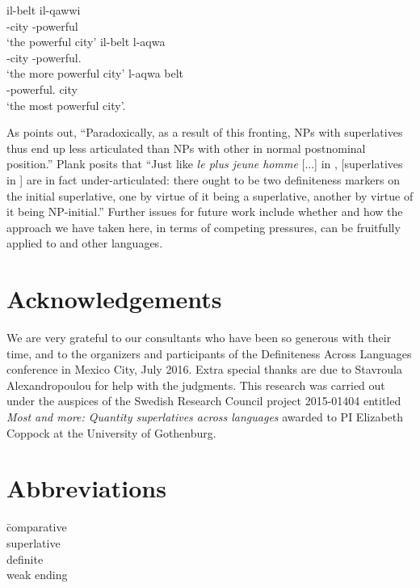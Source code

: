 \documentclass[output=paper
,modfonts
,nonflat]{langsci/langscibook}
\begin{document}
\ea \label{ex:coppockstrand:110}
\begin{xlist}
\ex \label{ex:coppockstrand:110a}
\gll  il-belt il-qawwi\\
-city -powerful\\ 
\glt `the powerful city'
\ex \label{ex:coppockstrand:110b}
\gll  il-belt l-aqwa\\
-city -powerful.\cmpr{}\\
\glt `the more powerful city' 
\ex \label{ex:coppockstrand:110c}
\gll  l-aqwa belt\\
-powerful.\cmpr{} city\\
\glt  `the most powerful city'.
\end{xlist}
\z

As \citet[361--362]{Plank2003} points out, ``Paradoxically, as a result of this fronting, NPs with superlatives thus end up less articulated than NPs with other  in normal postnominal position.'' Plank posits that ``Just like \textit{le plus jeune homme} [...] in , [superlatives in ] are in fact under-articulated: there ought to be two definiteness markers on the initial superlative, one by virtue of it being a superlative, another by virtue of it being NP-initial.'' Further issues for future work include whether and how the approach we have taken here, in terms of competing pressures, can be fruitfully applied to  and other  languages.

\section*{Acknowledgements}

We are very grateful to our consultants who have been so generous with their time, and to the organizers and participants of the Definiteness Across Languages conference in Mexico City, July 2016. Extra special thanks are due to Stavroula Alexandropoulou for help with the  judgments. This research was carried out under the auspices of the Swedish Research Council project 2015-01404 entitled \textit{Most and more: Quantity superlatives across languages} awarded to PI Elizabeth Coppock at the University of Gothenburg.

\section*{Abbreviations}
\begin{tabbing}
	\cmpr{}\hspace{1em} \= comparative\\ \kill
	\sprl{} \> superlative\\
	 \> definite\\
	\wk{} \> weak ending\\
\end{tabbing}

{\sloppy
\printbibliography[heading=subbibliography,notkeyword=this]
}
\end{document}
